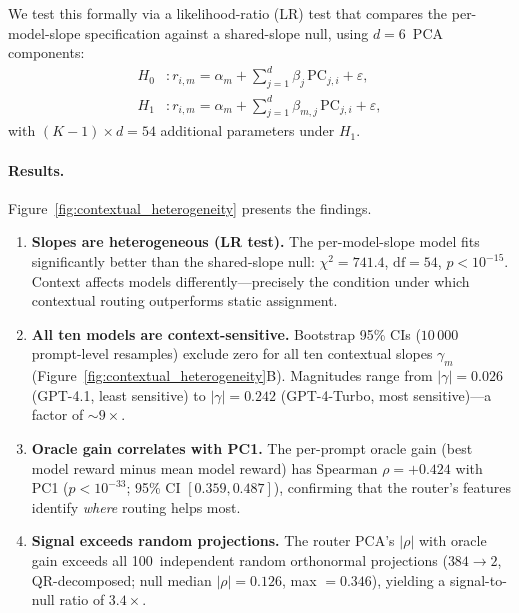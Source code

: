 We test this formally via a likelihood-ratio (LR) test that compares the
per-model-slope specification against a shared-slope null, using
$d{=}6$~PCA components:
\begin{align}
    H_0 &: r_{i,m} = \alpha_m + \textstyle\sum_{j=1}^{d} \beta_j \, \text{PC}_{j,i} + \varepsilon, \label{eq:h0}\\
    H_1 &: r_{i,m} = \alpha_m + \textstyle\sum_{j=1}^{d} \beta_{m,j} \, \text{PC}_{j,i} + \varepsilon, \label{eq:h1}
\end{align}
with $(K{-}1) \times d = 54$ additional parameters under $H_1$.


\paragraph{Results.}
Figure~\ref{fig:contextual_heterogeneity} presents the findings.

\begin{enumerate}[leftmargin=*,noitemsep,topsep=2pt]

\item \textbf{Slopes are heterogeneous (LR test).}
The per-model-slope model fits significantly better than the shared-slope
null: $\chi^2 = 741.4$, $\text{df} = 54$, $p < 10^{-15}$.
Context affects models differently---precisely the condition under which
contextual routing outperforms static assignment.

\item \textbf{All ten models are context-sensitive.}
Bootstrap 95\% CIs ($10\,000$ prompt-level resamples) exclude zero for
all ten contextual slopes $\gamma_m$
(Figure~\ref{fig:contextual_heterogeneity}B).
Magnitudes range from $|\gamma| = 0.026$ (GPT-4.1, least sensitive)
to $|\gamma| = 0.242$ (GPT-4-Turbo, most sensitive)---a factor of
${\sim}9\times$.

\item \textbf{Oracle gain correlates with PC1.}
The per-prompt oracle gain (best model reward minus mean model reward)
has Spearman $\rho = {+}0.424$ with PC1 ($p < 10^{-33}$; 95\% CI
$[0.359, 0.487]$), confirming that the router's features identify
\emph{where} routing helps most.

\item \textbf{Signal exceeds random projections.}
The router PCA's $|\rho|$ with oracle gain exceeds all 100~independent
random orthonormal projections ($384 \to 2$, QR-decomposed; null median
$|\rho| = 0.126$, max $= 0.346$), yielding a signal-to-null ratio of
$3.4\times$.

\end{enumerate}

